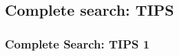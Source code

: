 \documentclass{beamer}
\begin{document}
\subsection{Complete search: TIPS}

\begin{frame}
  \frametitle{Complete Search: TIPS 1}
\end{frame}








\end{document}
